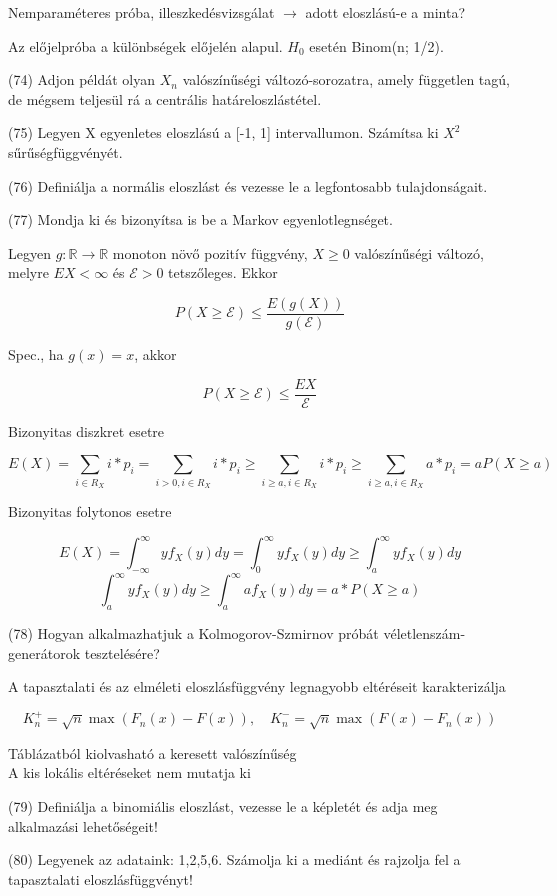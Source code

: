 \documentclass[12p]{article}
\begin{document}
Nemparaméteres próba, illeszkedésvizsgálat $\rightarrow$ adott eloszlású-e a minta?

Az előjelpróba a különbségek előjelén alapul. $H_0$ esetén Binom(n; 1/2).

(74) Adjon példát olyan $X_n$ valószínűségi változó-sorozatra, amely független tagú, de mégsem teljesül rá a centrális határeloszlástétel.

(75) Legyen X egyenletes eloszlású a [-1, 1] intervallumon. Számítsa ki $X^2$ sűrűségfüggvényét.

(76) Definiálja a normális eloszlást és vezesse le a legfontosabb tulajdonságait.

(77) Mondja ki és bizonyítsa is be a Markov egyenlotlegnséget.

Legyen $g : \mathbb{R} \rightarrow \mathbb{R}$ monoton növő pozitív függvény, $X \geq 0$ valószínűségi változó, melyre $EX < \infty$ és $\mathcal{E} > 0$ tetszőleges. Ekkor

$$P(X \geq \mathcal{E}) \leq \frac{E(g(X))}{g(\mathcal{E})}$$

Spec., ha $g(x) = x$, akkor

$$P(X \geq \mathcal{E}) \leq \frac{EX}{\mathcal{E}}$$

Bizonyitas diszkret esetre

$$E(X) = \sum_{i \in R_X} i*p_i = \sum_{i>0,i\in R_X} i*p_i \geq \sum_{i \geq a, i\in R_X} i*p_i \geq \sum_{i\geq a, i\in R_X} a*p_i = aP(X \geq a)$$

Bizonyitas folytonos esetre

$$E(X) = \int_{-\infty}^{\infty} yf_X(y)dy = \int_{0}^{\infty} yf_X(y)dy \geq \int_{a}^{\infty} yf_X(y)dy$$
$$\int_{a}^{\infty}yf_X(y)dy \geq \int_{a}^{\infty} af_X(y)dy = a * P(X \geq a)$$

(78) Hogyan alkalmazhatjuk a Kolmogorov-Szmirnov próbát véletlenszám-generátorok tesztelésére?

A tapasztalati és az elméleti eloszlásfüggvény
legnagyobb eltéréseit karakterizálja

$$K_n^{+} = \sqrt{n} \max (F_n(x) - F(x)), \quad K_n^{-}=\sqrt{n} \max(F(x) - F_n(x))$$

Táblázatból kiolvasható a keresett valószínűség\\
A kis lokális eltéréseket nem mutatja ki

(79) Definiálja a binomiális eloszlást, vezesse le a képletét és adja meg alkalmazási lehetőségeit!

(80) Legyenek az adataink: 1,2,5,6. Számolja ki a mediánt és rajzolja fel a tapasztalati eloszlásfüggvényt!
\end{document}
